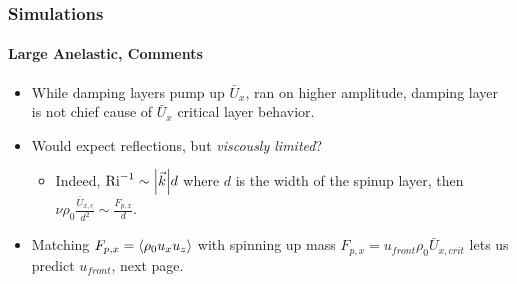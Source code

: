 \documentclass[dvipsnames, 10pt]{beamer}
\DeclarePairedDelimiter\abs{\lvert}{\rvert}
\DeclarePairedDelimiter\ev{\langle}{\rangle}
\begin{document}
\begin{frame}
    \frametitle{Simulations}
    \framesubtitle{Large Anelastic, Comments}

    \begin{itemize}
        \item While damping layers pump up $\bar{U}_x$, ran on higher amplitude,
            damping layer is not chief cause of $\bar{U}_x$ critical layer
            behavior. %

        \item Would expect reflections, but \emph{viscously limited}?
            \begin{itemize}
                \item Indeed, $\mathrm{Ri}^{-1} \sim \abs*{\vec{k}}d$ where $d$
                    is the width of the spinup layer, then $\nu \rho_0
                    \frac{\bar{U}_{x, c}}{d^2} \sim \frac{F_{p, x}}{d}$.
            \end{itemize}

        \item Matching $F_{p, x} = \ev*{\rho_0 u_x u_z}$ with spinning up mass
            $F_{p, x} = u_{front} \rho_0 \bar{U}_{x, crit}$ lets us predict
            $u_{front}$, next page.
    \end{itemize}
\end{frame}
\end{document}
